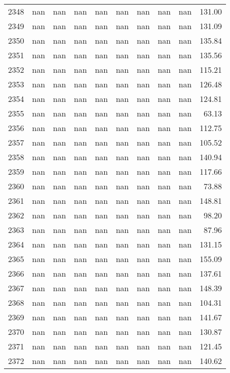 \begin{tabular}{lrrrrrrrrr}
2348 & nan & nan & nan & nan & nan & nan & nan & nan & 131.00 \\
2349 & nan & nan & nan & nan & nan & nan & nan & nan & 131.09 \\
2350 & nan & nan & nan & nan & nan & nan & nan & nan & 135.84 \\
2351 & nan & nan & nan & nan & nan & nan & nan & nan & 135.56 \\
2352 & nan & nan & nan & nan & nan & nan & nan & nan & 115.21 \\
2353 & nan & nan & nan & nan & nan & nan & nan & nan & 126.48 \\
2354 & nan & nan & nan & nan & nan & nan & nan & nan & 124.81 \\
2355 & nan & nan & nan & nan & nan & nan & nan & nan & 63.13 \\
2356 & nan & nan & nan & nan & nan & nan & nan & nan & 112.75 \\
2357 & nan & nan & nan & nan & nan & nan & nan & nan & 105.52 \\
2358 & nan & nan & nan & nan & nan & nan & nan & nan & 140.94 \\
2359 & nan & nan & nan & nan & nan & nan & nan & nan & 117.66 \\
2360 & nan & nan & nan & nan & nan & nan & nan & nan & 73.88 \\
2361 & nan & nan & nan & nan & nan & nan & nan & nan & 148.81 \\
2362 & nan & nan & nan & nan & nan & nan & nan & nan & 98.20 \\
2363 & nan & nan & nan & nan & nan & nan & nan & nan & 87.96 \\
2364 & nan & nan & nan & nan & nan & nan & nan & nan & 131.15 \\
2365 & nan & nan & nan & nan & nan & nan & nan & nan & 155.09 \\
2366 & nan & nan & nan & nan & nan & nan & nan & nan & 137.61 \\
2367 & nan & nan & nan & nan & nan & nan & nan & nan & 148.39 \\
2368 & nan & nan & nan & nan & nan & nan & nan & nan & 104.31 \\
2369 & nan & nan & nan & nan & nan & nan & nan & nan & 141.67 \\
2370 & nan & nan & nan & nan & nan & nan & nan & nan & 130.87 \\
2371 & nan & nan & nan & nan & nan & nan & nan & nan & 121.45 \\
2372 & nan & nan & nan & nan & nan & nan & nan & nan & 140.62 \\

\end{tabular}
